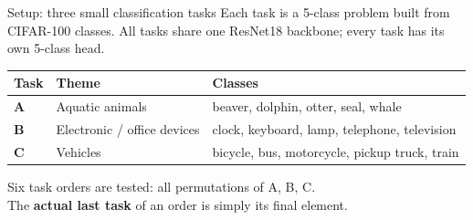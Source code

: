 \documentclass[aspectratio=169,11pt]{beamer}
\newcommand{\hl}[1]{{\color{accent}\bfseries #1}}
\begin{document}
\begin{frame}{Setup: three small classification tasks}
  Each task is a 5-class problem built from CIFAR-100 classes. All tasks share one ResNet18 backbone; every task has its own 5-class head.

  \bigskip
  \centering
  \begin{tabular}{@{}llp{7.5cm}@{}}
    \toprule
    \textbf{Task} & \textbf{Theme} & \textbf{Classes}\\
    \midrule
    \hl{A} & Aquatic animals & beaver, dolphin, otter, seal, whale\\[2pt]
    \hl{B} & Electronic / office devices & clock, keyboard, lamp, telephone, television\\[2pt]
    \hl{C} & Vehicles & bicycle, bus, motorcycle, pickup truck, train\\
    \bottomrule
  \end{tabular}

  \bigskip
  \raggedright
  Six task orders are tested: all permutations of A, B, C. \\
  The \hl{actual last task} of an order is simply its final element.
\end{frame}
\end{document}
